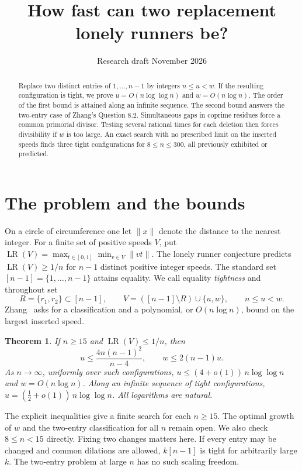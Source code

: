 \documentclass[11pt,a4paper]{article}
\title{\bfseries How fast can two replacement lonely runners be?}
\author{}
\date{\small Research draft \quad 26 November 2026}
\newtheorem{theorem}{Theorem}
\newcommand{\LR}{\operatorname{LR}}
\newcommand{\dist}[1]{\lVert #1\rVert}
\begin{document}
\maketitle
\begin{abstract}
Replace two distinct entries of $1,\ldots,n-1$ by integers $n\le u<w$.
If the resulting configuration is tight, we prove
$u=O(n\log\log n)$ and $w=O(n\log n)$. The order of the first
bound is attained along an infinite sequence. The second bound answers
the two-entry case of Zhang's Question 8.2. Simultaneous gaps in coprime
residues force a common primorial divisor. Testing several rational times
for each deletion then forces divisibility if $w$ is too large.
An exact search with no
prescribed limit on the inserted speeds finds three tight configurations
for $8\le n\le300$, all previously exhibited or predicted.
\end{abstract}

\section{The problem and the bounds}
On a circle of circumference one let $\dist{x}$ denote the distance to
the nearest integer. For a finite set of positive speeds $V$, put
$\LR(V)=\max_{t\in[0,1]}\min_{v\in V}\dist{vt}$. The lonely runner
conjecture predicts $\LR(V)\ge1/n$ for $n-1$ distinct positive integer
speeds. The standard set $[n-1]=\{1,\ldots,n-1\}$ attains equality.
We call equality \emph{tightness} and throughout set
\[
 R=\{r_1,r_2\}\subset[n-1],\qquad
 V=([n-1]\setminus R)\cup\{u,w\},\qquad n\le u<w.
\]
Zhang~\cite[Questions 8.1--8.2]{Z} asks for a classification and a
polynomial, or $O(n\log n)$, bound on the largest inserted speed.

\begin{theorem}\label{thm:main}
If $n\ge15$ and $\LR(V)\le1/n$, then
\[
 u\le\frac{4n(n-1)^2}{n-4},\qquad w\le2(n-1)u.
\]
As $n\to\infty$, uniformly over such configurations,
$u\le(4+o(1))\,n\log\log n$ and $w=O(n\log n)$. Along an infinite sequence of tight
configurations, $u=(\tfrac12+o(1))\,n\log\log n$. All logarithms are natural.
\end{theorem}

The explicit inequalities give a finite search for each $n\ge15$.
The optimal growth of $w$ and the two-entry classification for all $n$
remain open. We also check $8\le n<15$ directly. Fixing two changes
matters here. If every entry may be changed and common dilations are
allowed, $k[n-1]$ is tight for arbitrarily large $k$. The two-entry
problem at large $n$ has no such scaling freedom.
\end{document}
